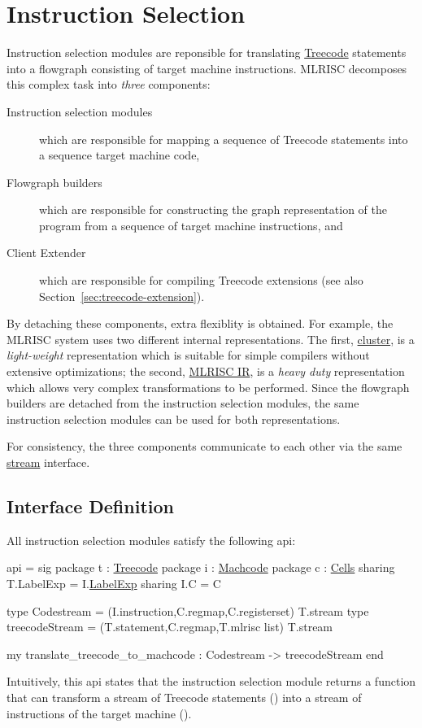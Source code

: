 \section{Instruction Selection} \label{sec:instrsel}
Instruction selection modules are reponsible for translating 
\href{treecode.html}{Treecode} statements into a flowgraph consisting
of target machine instructions.  MLRISC decomposes this complex task 
into \emph{three} components:
\begin{description}
   \item[Instruction selection modules] which are responsible for
mapping a sequence of Treecode statements into a sequence target machine code,
   \item[Flowgraph builders]  which are responsible for constructing
the graph representation of the program from a sequence of target machine
instructions, and
   \item[Client Extender] which are responsible for compiling 
Treecode extensions (see also Section~\ref{sec:treecode-extension}).
\end{description}
By detaching these components, extra flexiblity is obtained.  For example,
the MLRISC system uses two different internal representations.  The
first, \href{cluster.html}{cluster}, is a \emph{light-weight} representation
which is suitable for simple compilers without extensive 
optimizations; the second, \href{mlrisc-ir.html}{MLRISC IR}, is a 
\emph{heavy duty} representation which allows very complex transformations
to be performed.  Since the flowgraph builders are detached from the
instruction selection modules, the same instruction selection modules
can be used for both representations.  

For consistency, the three components communicate to each other 
via the same \href{stream.html}{stream} interface.

\subsection{Interface Definition}
All instruction selection modules satisfy the following api:

\begin{SML}
api  = 
sig
   package t : \href{treecode.html}{Treecode}
   package i : \href{instructions.html}{Machcode}
   package c : \href{cells.html}{Cells}
      sharing T.LabelExp = I.\href{labelexp.html}{LabelExp}
      sharing I.C = C

   type Codestream = (I.instruction,C.regmap,C.registerset) T.stream
   type treecodeStream = (T.statement,C.regmap,T.mlrisc list) T.stream

   my translate_treecode_to_machcode : Codestream -> treecodeStream
end
\end{SML}
Intuitively, this api states that
the instruction selection module 
returns a function that can transform a stream of Treecode statements 
() into a stream of instructions of the target 
machine ().  


